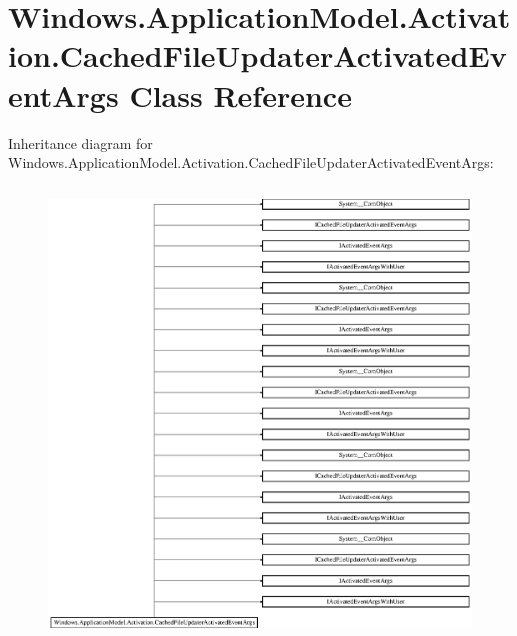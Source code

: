 \hypertarget{class_windows_1_1_application_model_1_1_activation_1_1_cached_file_updater_activated_event_args}{}\section{Windows.\+Application\+Model.\+Activation.\+Cached\+File\+Updater\+Activated\+Event\+Args Class Reference}
\label{class_windows_1_1_application_model_1_1_activation_1_1_cached_file_updater_activated_event_args}
Inheritance diagram for Windows.\+Application\+Model.\+Activation.\+Cached\+File\+Updater\+Activated\+Event\+Args\+:\begin{figure}[H]
\begin{center}
\leavevmode
\includegraphics[height=12.000000cm]{class_windows_1_1_application_model_1_1_activation_1_1_cached_file_updater_activated_event_args}
\end{center}
\end{figure}
